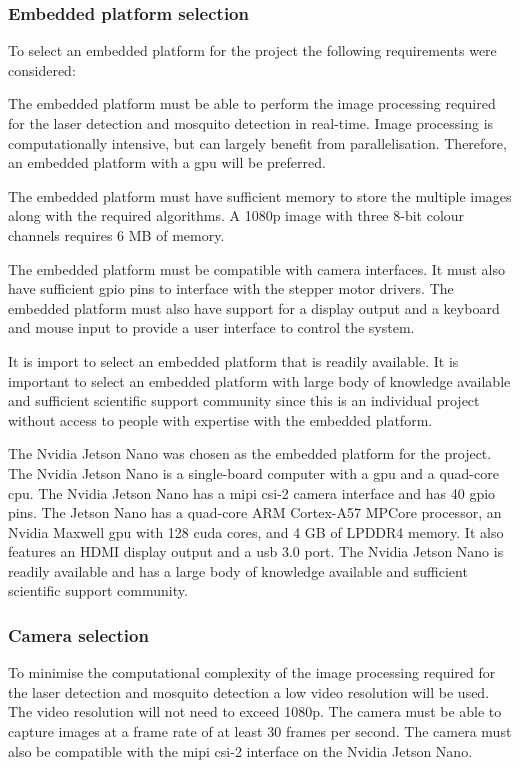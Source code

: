 \subsubsection{Embedded platform selection}
To select an embedded platform for the project the following requirements were considered:
\begin{description}[style=nextline]
  \item[Processing power] The embedded platform must be able to perform the image processing required for the laser detection and mosquito detection in real-time. Image processing is computationally intensive, but can largely benefit from parallelisation. Therefore, an embedded platform with a \gls{gpu} will be preferred.
  \item[Memory] The embedded platform must have sufficient memory to store the multiple images along with the required algorithms. A 1080p image with three 8-bit colour channels requires 6 MB of memory.
  \item[Hardware interfaces] The embedded platform must be compatible with camera interfaces. It must also have sufficient \gls{gpio} pins to interface with the stepper motor drivers. The embedded platform must also have support for a display output and a keyboard and mouse input to provide a user interface to control the system.
  \item[Availability and support] It is import to select an embedded platform that is readily available. It is important to select an embedded platform with large body of knowledge available and sufficient scientific support community since this is an individual project without access to people with expertise with the embedded platform.
\end{description}

The Nvidia Jetson Nano was chosen as the embedded platform for the project. The Nvidia Jetson Nano is a single-board computer with a \gls{gpu} and a quad-core \gls{cpu}. The Nvidia Jetson Nano has a \gls{mipi} \gls{csi}-2 camera interface and has 40 \gls{gpio} pins. The Jetson Nano has a quad-core ARM Cortex-A57 MPCore processor, an Nvidia Maxwell \gls{gpu} with 128 \gls{cuda} cores, and 4 GB of LPDDR4 memory. It also features an HDMI display output and a \gls{usb} 3.0 port. The Nvidia Jetson Nano is readily available and has a large body of knowledge available and sufficient scientific support community.



\subsubsection{Camera selection}
To minimise the computational complexity of the image processing required for the laser detection and mosquito detection a low video resolution will be used. The video resolution will not need to exceed 1080p. The camera must be able to capture images at a frame rate of at least 30 frames per second. The camera must also be compatible with the \gls{mipi} \gls{csi}-2 interface on the Nvidia Jetson Nano.


